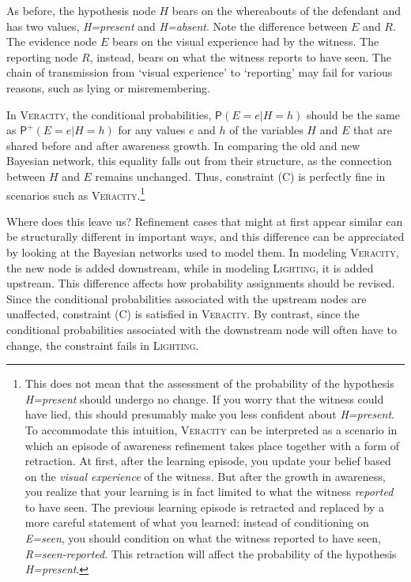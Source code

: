 \documentclass[
  11pt,
  dvipsnames,enabledeprecatedfontcommands, todos]{scrartcl}
\newcommand{\pr}[1]{\ensuremath{\mathsf{P}(#1)}}
\newcommand{\ppr}[2]{\ensuremath{\mathsf{P}^{#1}(#2)}}
\begin{document}
\noindent As before, the hypothesis node \(H\) bears on the whereabouts
of the defendant and has two values, \textit{H=present} and
\textit{H=absent}. Note the difference between \(E\) and \(R\). The
evidence node \(E\) bears on the visual experience had by the witness.
The reporting node \(R\), instead, bears on what the witness reports to
have seen. The chain of transmission from `visual experience' to
`reporting' may fail for various reasons, such as lying or
misremembering.

In \textsc{Veracity}, the conditional probabilities,
\(\pr{E=e \vert H=h}\) should be the same as \(\ppr{+}{E=e \vert H=h}\)
for any values \(e\) and \(h\) of the variables \(H\) and \(E\) that are
shared before and after awareness growth. In comparing the old and new
Bayesian network, this equality falls out from their structure, as the
connection between \(H\) and \(E\) remains unchanged. Thus, constraint
(C) is perfectly fine in scenarios such as \textsc{Veracity}.\footnote{This
  does not mean that the assessment of the probability of the hypothesis
  \textit{H=present} should undergo no change. If you worry that the
  witness could have lied, this should presumably make you less
  confident about \textit{H=present}. To accommodate this intuition,
  \textsc{Veracity} can be interpreted as a scenario in which an episode
  of awareness refinement takes place together with a form of
  retraction. At first, after the learning episode, you update your
  belief based on the \textit{visual experience} of the witness. But
  after the growth in awareness, you realize that your learning is in
  fact limited to what the witness \textit{reported} to have seen. The
  previous learning episode is retracted and replaced by a more careful
  statement of what you learned: instead of conditioning on
  \textit{E=seen}, you should condition on what the witness reported to
  have seen, \textit{R=seen-reported}. This retraction will affect the
  probability of the hypothesis \textit{H=present}.}

Where does this leave us? Refinement cases that might at first appear
similar can be structurally different in important ways, and this
difference can be appreciated by looking at the Bayesian networks used
to model them. In modeling \textsc{Veracity}, the new node is added
downstream, while in modeling \textsc{Lighting}, it is added upstream.
This difference affects how probability assignments should be revised.
Since the conditional probabilities associated with the upstream nodes
are unaffected, constraint (C) is satisfied in \textsc{Veracity}. By
contrast, since the conditional probabilities associated with the
downstream node will often have to change, the constraint fails in
\textsc{Lighting}.
\end{document}
